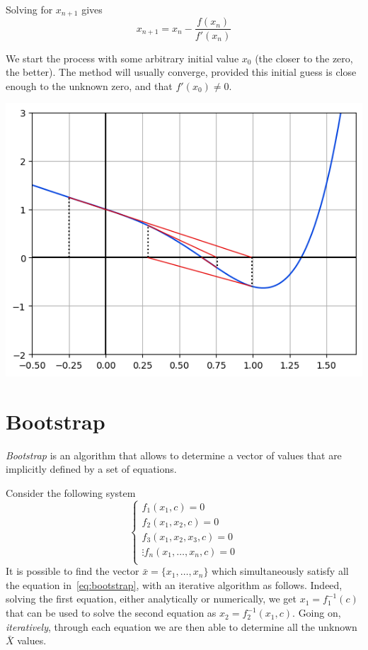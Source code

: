 \documentclass[12pt,a4paper]{book}
\begin{document}
Solving for $x_{n+1}$ gives
\begin{equation}
	x_{n+1}=x_{n}-{\frac {f(x_{n})}{f'(x_{n})}}
\end{equation}

We start the process with some arbitrary initial value $x_0$ (the closer to the zero, the better). The method will usually converge, provided this initial guess is close enough to the unknown zero, and that $f'(x_0) \neq 0$.
\begin{center}
	\includegraphics[width=0.6\linewidth]{addons/newton_method}
\end{center}

\section{Bootstrap}
\emph{Bootstrap} is an algorithm that allows to determine a vector of values that are implicitly defined by a set of equations.

Consider the following system 
\begin{equation}
	\begin{cases}
		f_1(x_1, c) = 0\\
		f_2(x_1, x_2, c) = 0\\
		f_3(x_1, x_2, x_3, c) = 0\\
		\vdots
		f_n(x_1,\ldots,x_n, c) = 0\\
	\end{cases}
\label{eq:bootstrap}
\end{equation}
It is possible to find the vector $\bar{x} = \{x_1,\ldots,x_n\}$ which simultaneously satisfy all the equation in~\ref{eq:bootstrap}, with an iterative algorithm as follows.
Indeed, solving the first equation, either analytically or numerically, we get $x_1 = f_1^{-1}(c)$ that can be used to solve the second equation as $x_2 = f_2^{-1}(x_1, c)$.
Going on, \emph{iteratively}, through each equation we are then able to determine all the unknown $\bar{X}$ values.
\end{document}
